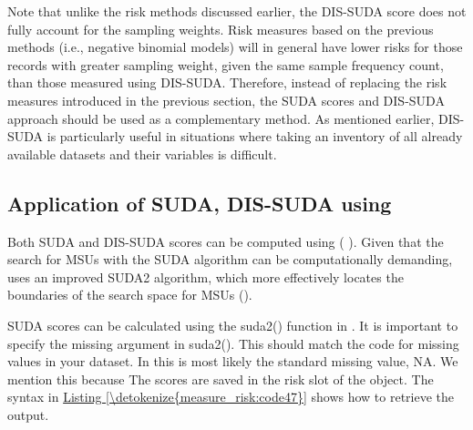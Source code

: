 \documentclass[letterpaper,10pt,english]{sphinxmanual}
\begin{document}
Note that unlike the risk methods discussed earlier, the DIS-SUDA score
does not fully account for the sampling weights. Risk measures based on
the previous methods (i.e., negative binomial models) will in general
have lower risks for those records with greater sampling weight, given
the same sample frequency count, than those measured using DIS-SUDA.
Therefore, instead of replacing the risk measures introduced in the
previous section, the SUDA scores and DIS-SUDA approach should be used
as a complementary method. As mentioned earlier, DIS-SUDA is
particularly useful in situations where taking an inventory of all
already available datasets and their variables is difficult.


\subsection{Application of SUDA, DIS-SUDA using }
\label{\detokenize{measure_risk:application-of-suda-dis-suda-using-sdcmicro}}
Both SUDA and DIS-SUDA scores can be computed using  ({\hyperref[\detokenize{measure_risk:tmkc14}]{}}
). Given that the search for MSUs with the SUDA algorithm can
be computationally demanding,  uses an improved SUDA2
algorithm, which more effectively locates the boundaries of the search
space for MSUs ({\hyperref[\detokenize{measure_risk:mahk08}]{}}).

SUDA scores can be calculated using the suda2() function in .
It is important to specify the missing argument in suda2(). This should
match the code for missing values in your dataset. In  this is most
likely the  standard missing value, NA. We mention this because  The scores are saved in the risk slot of the 
object. The syntax in \hyperref[\detokenize{measure_risk:code47}]{Listing \ref{\detokenize{measure_risk:code47}}} shows how to retrieve the output.
\end{document}
